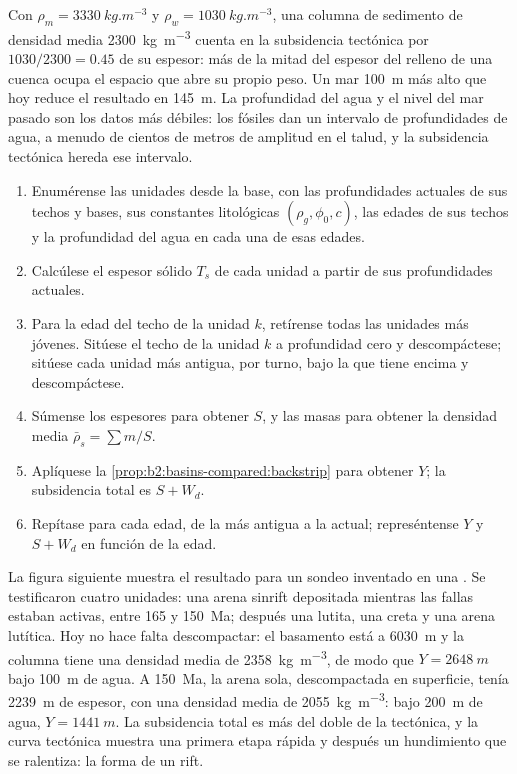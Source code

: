 Con $\rho_m = \qty{3330}{kg.m^{-3}}$ y $\rho_w = \qty{1030}{kg.m^{-3}}$, una columna de sedimento de
densidad media \qty{2300}{kg.m^{-3}} cuenta en la subsidencia tectónica por $1030/2300 = 0.45$ de su espesor:
más de la mitad del espesor del relleno de una cuenca ocupa el espacio que abre su propio peso.
Un mar \qty{100}{m} más alto que hoy reduce el resultado en \qty{145}{m}. La profundidad del agua y el
nivel del mar pasado son los datos más débiles: los fósiles dan un intervalo de profundidades de agua, a menudo de cientos de
metros de amplitud en el talud, y la subsidencia tectónica hereda ese intervalo.

\begin{method}\label{met:b2:basins-compared:backstrip}
\begin{enumerate}
  \item Enumérense las unidades desde la base, con las profundidades actuales de sus techos y bases, sus
        constantes litológicas $(\rho_g, \phi_0, c)$, las edades de sus techos y la profundidad del agua en
        cada una de esas edades.
  \item Calcúlese el espesor sólido $T_s$ de cada unidad a partir de sus profundidades actuales.
  \item Para la edad del techo de la unidad $k$, retírense todas las unidades más jóvenes. Sitúese el techo de la unidad
        $k$ a profundidad cero y descompáctese; sitúese cada unidad más antigua, por turno, bajo la que tiene encima
        y descompáctese.
  \item Súmense los espesores para obtener $S$, y las masas para obtener la densidad media
        $\bar\rho_s = \sum m / S$.
  \item Aplíquese la \cref{prop:b2:basins-compared:backstrip} para obtener $Y$; la subsidencia total es
        $S + W_d$.
  \item Repítase para cada edad, de la más antigua a la actual; represéntense $Y$ y $S + W_d$ en función de la edad.
\end{enumerate}
\end{method}

La figura siguiente muestra el resultado para un sondeo inventado en una . Se testificaron cuatro unidades:
una arena sinrift depositada mientras las fallas estaban activas, entre 165 y \qty{150}{Ma}; después una lutita,
una creta y una arena lutítica. Hoy no hace falta descompactar: el basamento está a \qty{6030}{m}
y la columna tiene una densidad media de \qty{2358}{kg.m^{-3}}, de modo que $Y = \qty{2648}{m}$ bajo
\qty{100}{m} de agua. A \qty{150}{Ma}, la arena sola, descompactada en superficie, tenía
\qty{2239}{m} de espesor, con una densidad media de \qty{2055}{kg.m^{-3}}: bajo \qty{200}{m} de agua,
$Y = \qty{1441}{m}$. La subsidencia total es
más del doble de la tectónica, y la curva tectónica muestra una primera etapa rápida y después un
hundimiento que se ralentiza: la forma de un rift.

